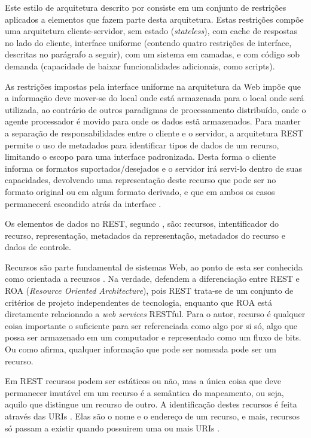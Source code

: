 \documentclass[diss]{template/setrem}
\begin{document}
Este estilo de arquitetura descrito por \citet{Fielding2000} consiste em um conjunto de restrições aplicados a elementos que fazem parte desta arquitetura. Estas restrições compõe uma arquitetura cliente-servidor, sem estado (\emph{stateless}), com cache de respostas no lado do cliente, interface uniforme (contendo quatro restrições de interface, descritas no parágrafo a seguir), com um sistema em camadas, e com código sob demanda (capacidade de baixar funcionalidades adicionais, como scripts).

As restrições impostas pela interface uniforme na arquitetura da Web impõe que a informação deve mover-se do local onde está armazenada para o local onde será utilizada, ao contrário de outros paradigmas de processamento distribuído, onde o agente processador é movido para onde os dados estã armazenados. Para manter a separação de responsabilidades entre o cliente e o servidor, a arquitetura REST permite o uso de metadados para identificar tipos de dados de um recurso, limitando o escopo para uma interface padronizada. Desta forma o cliente informa os formatos suportados/desejados e o servidor irá servi-lo dentro de suas capacidades, devolvendo uma representação deste recurso que pode ser no formato original ou em algum formato derivado, e que em ambos os casos permanecerá escondido atrás da interface \citep{Fielding2000}.

Os elementos de dados no REST, segundo \citet{Fielding2000}, são: recursos, intentificador do recurso, representação, metadados da representação, metadados do recurso e dados de controle.

Recursos são parte fundamental de sistemas Web, ao ponto de esta ser conhecida como orientada a recursos \citep{Webber2010}. Na verdade, \citet{Richardson2007} defendem a diferenciação entre REST e ROA (\emph{Resource Oriented Architecture}), pois REST trata-se de um conjunto de critérios de projeto independentes de tecnologia, enquanto que ROA está diretamente relacionado a \emph{web services} RESTful. Para o autor, recurso é qualquer coisa importante o suficiente para ser referenciada como algo por si só, algo que possa ser armazenado em um computador e representado como um fluxo de bits. Ou como \citet{Fielding2000} afirma, qualquer informação que pode ser nomeada pode ser um recurso.

Em REST recursos podem ser estáticos ou não, mas a única coisa que deve permanecer imutável em um recurso é a semântica do mapeamento, ou seja, aquilo que distingue um recurso de outro. A identificação destes recursos é feita através das URIs \citep{Fielding2000}. Elas são o nome e o endereço de um recurso, e mais, recursos só passam a existir quando possuirem uma ou mais URIs \citep{Richardson2007}.
\end{document}
